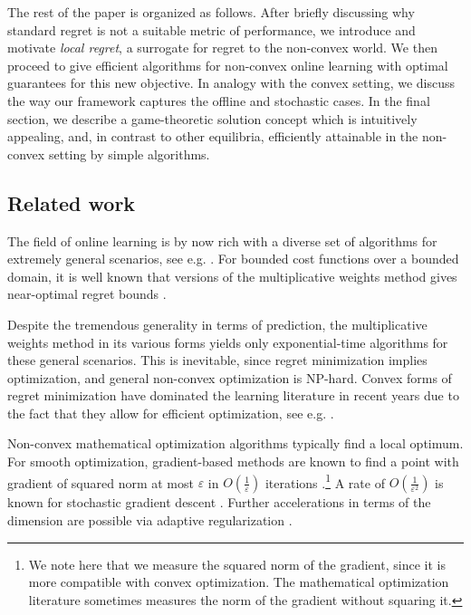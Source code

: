 \documentclass{article}
\begin{document}
The rest of the paper is organized as follows.
After briefly discussing why standard regret is not a suitable metric of performance, we introduce and motivate \textit{local regret}, a surrogate for regret to the non-convex world. We then proceed to give efficient algorithms for non-convex online learning with optimal guarantees for this new objective. In analogy with the convex setting, we discuss the way our framework captures the offline and stochastic cases. In the final section, we describe a game-theoretic solution concept which is intuitively appealing, and, in contrast to other equilibria, efficiently attainable in the non-convex setting by simple algorithms.

\subsection{Related work}

The field of online learning is by now rich with a diverse set of algorithms for extremely general scenarios, see e.g. \citep{CesaBianchiLugosi06book}. For bounded cost functions over a bounded domain, it is well known that versions of the multiplicative weights method gives near-optimal regret bounds \citep{cover,Vovk:1990,AHK-MW}. 

Despite the tremendous generality in terms of prediction, the multiplicative weights method in its various forms yields only exponential-time algorithms for these general scenarios. This is inevitable, since regret minimization implies optimization, and general non-convex optimization is NP-hard. Convex forms of regret minimization have dominated the learning literature in recent years due to the fact that they allow for efficient optimization, see e.g. \cite{OCObook,shalev2011online}. 

Non-convex mathematical optimization algorithms typically find a local optimum. For smooth optimization, gradient-based methods are known to find a point with gradient of squared norm at most $\varepsilon$ in $O(\frac{1}{\varepsilon})$ iterations \citep{NesterovBook}.\footnote{We note here that we measure the squared norm of the gradient, since it is more compatible with convex optimization. The mathematical optimization literature sometimes measures the norm of the gradient without squaring it.} A rate of $O(\frac{1}{\varepsilon^2})$ is known for stochastic gradient descent \citep{ghadimi-lan}. Further accelerations in terms of the dimension are possible via adaptive regularization \citep{adagrad}.
\end{document}
